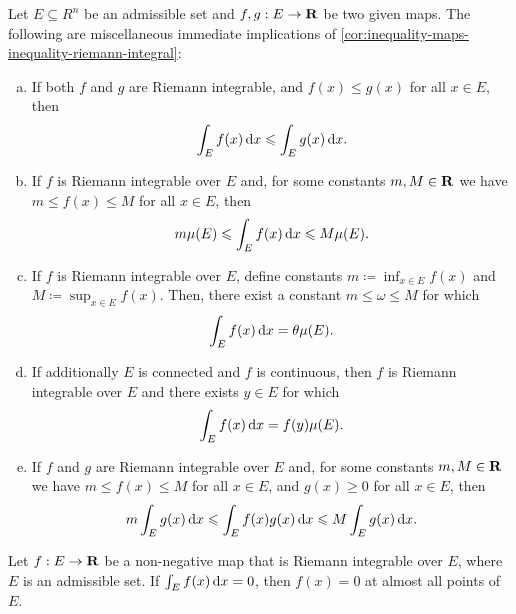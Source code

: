 \begin{corollary}
    \label{cor:inequality-maps-inequality-riemann-integral}
    Let \(E \subseteq R^n\) be an admissible set and \(f, g: E \to \mathbf{R}\) be two given
    maps. The following are miscellaneous immediate implications of
    \cref{cor:inequality-maps-inequality-riemann-integral}:
    \begin{enumerate}[(a)]\setlength\itemsep{0em}
        \item If both \(f\) and \(g\) are Riemann integrable, and \(f(x) \leq g(x)\) for
              all \(x \in E\), then
              \[
                  \int_E f(x)\, \mathrm{d} x \leqslant \int_E g(x)\, \mathrm{d} x.
              \]

        \item If \(f\) is Riemann integrable over \(E\) and, for some constants \(m, M
              \in \mathbf{R}\) we have \(m \leq f(x) \leq M\) for all \(x \in E\), then
              \[
                  m \mu(E) \leqslant \int_E f(x)\, \mathrm{d} x \leqslant M \mu(E).
              \]

        \item If \(f\) is Riemann integrable over \(E\), define constants \(m
              \coloneq \inf_{x \in E} f(x)\) and \(M \coloneq \sup_{x \in E} f(x)\). Then,
              there exist a constant \(m \leq \omega \leq M\) for which
              \[
                  \int_E f(x)\, \mathrm{d} x = \theta \mu(E).
              \]

        \item If additionally \(E\) is connected and \(f\) is continuous, then \(f\) is
              Riemann integrable over \(E\) and there exists \(y \in E\) for which
              \[
                  \int_E f(x)\, \mathrm{d} x = f(y) \mu(E).
              \]

        \item If \(f\) and \(g\) are Riemann integrable over \(E\) and, for some
              constants \(m, M \in \mathbf{R}\) we have \(m \leq f(x) \leq M\) for all \(x \in E\),
              and \(g(x) \geq 0\) for all \(x \in E\), then
              \[
                  m \int_E g(x)\, \mathrm{d} x \leqslant \int_E f(x) g(x)\, \mathrm{d} x
                  \leqslant M \int_E g(x)\, \mathrm{d} x.
              \]
    \end{enumerate}
\end{corollary}

\begin{lemma}
    \label{lem:zero-integral-jordan-measure-zero}
    Let \(f: E \to \mathbf{R}\) be a non-negative map that is Riemann integrable over
    \(E\), where \(E\) is an admissible set. If \(\int_E f(x)\, \mathrm{d} x = 0\), then
    \(f(x) = 0\) at almost all points of \(E\).
\end{lemma}

